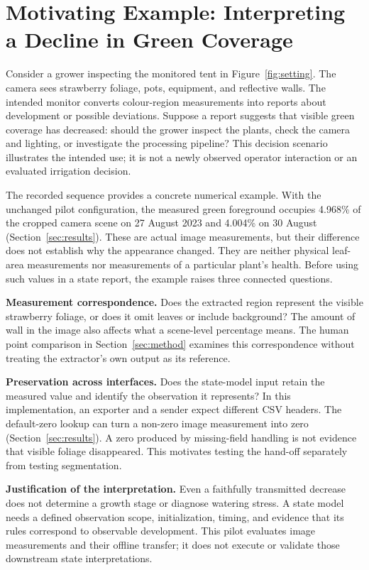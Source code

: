 \documentclass[runningheads]{llncs}
\begin{document}
\section{Motivating Example: Interpreting a Decline in Green Coverage}
\label{sec:motivation}
Consider a grower inspecting the monitored tent in Figure~\ref{fig:setting}. The camera sees strawberry foliage, pots, equipment, and reflective walls. The intended monitor converts colour-region measurements into reports about development or possible deviations. Suppose a report suggests that visible green coverage has decreased: should the grower inspect the plants, check the camera and lighting, or investigate the processing pipeline? This decision scenario illustrates the intended use; it is not a newly observed operator interaction or an evaluated irrigation decision.

The recorded sequence provides a concrete numerical example. With the unchanged pilot configuration, the measured green foreground occupies 4.968\% of the cropped camera scene on 27 August 2023 and 4.004\% on 30 August (Section~\ref{sec:results}). These are actual image measurements, but their difference does not establish why the appearance changed. They are neither physical leaf-area measurements nor measurements of a particular plant's health. Before using such values in a state report, the example raises three connected questions.

\textbf{Measurement correspondence.} Does the extracted region represent the visible strawberry foliage, or does it omit leaves or include background? The amount of wall in the image also affects what a scene-level percentage means. The human point comparison in Section~\ref{sec:method} examines this correspondence without treating the extractor's own output as its reference.

\textbf{Preservation across interfaces.} Does the state-model input retain the measured value and identify the observation it represents? In this implementation, an exporter and a sender expect different CSV headers. The default-zero lookup can turn a non-zero image measurement into zero (Section~\ref{sec:results}). A zero produced by missing-field handling is not evidence that visible foliage disappeared. This motivates testing the hand-off separately from testing segmentation.

\textbf{Justification of the interpretation.} Even a faithfully transmitted decrease does not determine a growth stage or diagnose watering stress. A state model needs a defined observation scope, initialization, timing, and evidence that its rules correspond to observable development. This pilot evaluates image measurements and their offline transfer; it does not execute or validate those downstream state interpretations.
\end{document}

